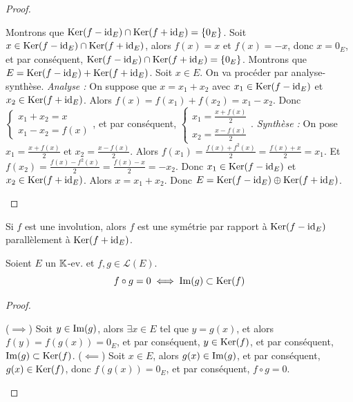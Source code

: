 \documentclass[12pt, a4paper]{report}
\begin{document}
\begin{proof}
    \begin{outline}
        \1 Montrons que $\mathrm{Ker}(f - \mathrm{id}_E) \cap \mathrm{Ker}(f + \mathrm{id}_E) = \{0_E\}$.
        \2 Soit $x \in \mathrm{Ker}(f - \mathrm{id}_E) \cap \mathrm{Ker}(f + \mathrm{id}_E)$, alors $f(x) = x$ et $f(x) = -x$, donc $x = 0_E$, et par conséquent, $\mathrm{Ker}(f - \mathrm{id}_E) \cap \mathrm{Ker}(f + \mathrm{id}_E) = \{0_E\}$.
        \1 Montrons que $E = \mathrm{Ker}(f - \mathrm{id}_E) + \mathrm{Ker}(f + \mathrm{id}_E)$.
        \2 Soit $x \in E$. On va procéder par analyse-synthèse.
        \2 \textit{Analyse :}
        \3 On suppose que $x = x_1 + x_2$ avec $x_1 \in \mathrm{Ker}(f - \mathrm{id}_E)$ et $x_2 \in \mathrm{Ker}(f + \mathrm{id}_E)$.
        \3 Alors $f(x) = f(x_1) + f(x_2) = x_1 - x_2$.
        \3 Donc $\begin{cases}x_1 + x_2 = x\\ x_1 - x_2 = f(x)\end{cases}$, et par conséquent, $\begin{cases}x_1 = \frac{x + f(x)}{2}\\ x_2 = \frac{x - f(x)}{2}\end{cases}$.
        \2 \textit{Synthèse :}
        \3 On pose $x_1 = \frac{x + f(x)}{2}$ et $x_2 = \frac{x - f(x)}{2}$.
        \3 Alors $f(x_1) = \frac{f(x) + f^2(x)}{2} = \frac{f(x) + x}{2} = x_1$.
        \3 Et $f(x_2) = \frac{f(x) - f^2(x)}{2} = \frac{f(x) - x}{2} = -x_2$.
        \3 Donc $x_1 \in \mathrm{Ker}(f - \mathrm{id}_E)$ et $x_2 \in \mathrm{Ker}(f + \mathrm{id}_E)$.
        \3 Alors $x = x_1 + x_2$.
        \1 Donc $E = \mathrm{Ker}(f - \mathrm{id}_E) \oplus \mathrm{Ker}(f + \mathrm{id}_E)$.
    \end{outline}
\end{proof}

\begin{remark}
    Si $f$ est une involution, alors $f$ est une symétrie par rapport à $\mathrm{Ker}(f - \mathrm{id}_E)$ parallèlement à $\mathrm{Ker}(f + \mathrm{id}_E)$.
\end{remark}

\begin{theorem}[Lemme]
    Soient $E$ un $\mathbb{K}$-ev. et $f,g \in \mathcal L(E)$.
    $$f \circ g = 0 \iff \mathrm{Im}(g) \subset \mathrm{Ker}(f)$$
\end{theorem}

\begin{proof}
    \begin{outline}
        \1 ($\implies$) Soit $y \in \mathrm{Im}(g)$, alors $\exists x \in E$ tel que $y = g(x)$, et alors $f(y) = f(g(x)) = 0_E$, et par conséquent, $y \in \mathrm{Ker}(f)$, et par conséquent, $\mathrm{Im}(g) \subset \mathrm{Ker}(f)$.
        \1 ($\impliedby$) Soit $x \in E$, alors $g(x) \in \mathrm{Im}(g)$, et par conséquent, $g(x) \in \mathrm{Ker}(f)$, donc $f(g(x)) = 0_E$, et par conséquent, $f\circ g = 0$.
    \end{outline}
\end{proof}
\end{document}
